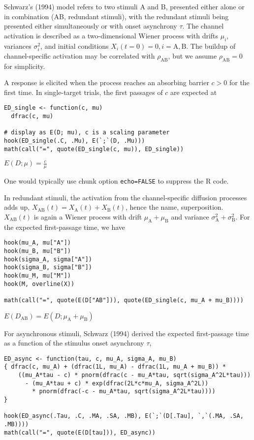 Schwarz's (1994) model refers to two stimuli A and B, presented either
alone or in combination (AB, redundant stimuli), with the redundant
stimuli being presented either simultaneously or with onset asynchrony
\(\tau\). The channel activation is described as a two-dimensional Wiener
process with drifts \(\mu_i\), variances \(\sigma^2_i\), and initial
conditions \(X_i(t = 0) = 0, i = \mathrm{A, B}\). The buildup of
channel-specific activation may be correlated with \(\rho_{\mathrm{AB}}\),
but we assume \(\rho_{\mathrm{AB}} = 0\) for simplicity.

A response is elicited when the process reaches an absorbing barrier
\(c > 0\) for the first time. In single-target trials, the first passages
of \(c\) are expected at

\begin{verbatim}
ED_single <- function(c, mu)
  dfrac(c, mu)

# display as E(D; mu), c is a scaling parameter
hook(ED_single(.C, .Mu), E(`;`(D, .Mu)))
math(call("=", quote(ED_single(c, mu)), ED_single))
\end{verbatim}

\({E{\left({D}{;}{\mu}\right)}}{=}{\displaystyle{\frac{c}{\mu}}}\)

One would typically use chunk option \texttt{echo=FALSE} to suppress the R
code.

In redundant stimuli, the activation from the channel-specific diffusion
processes adds up,
\(X_{\mathrm{AB}}(t) = X_{\mathrm A}(t) + X_{\mathrm B}(t)\), hence the
name, superposition. \(X_{\mathrm{AB}}(t)\) is again a Wiener process with
drift \(\mu_{\mathrm A} + \mu_{\mathrm B}\) and variance
\(\sigma^2_{\mathrm A} + \sigma^2_{\mathrm B}\). For the expected
first-passage time, we have

\begin{verbatim}
hook(mu_A, mu["A"])
hook(mu_B, mu["B"])
hook(sigma_A, sigma["A"])
hook(sigma_B, sigma["B"])
hook(mu_M, mu["M"])
hook(M, overline(X))

math(call("=", quote(E(D["AB"])), quote(ED_single(c, mu_A + mu_B))))
\end{verbatim}

\({E{\left({D}_{\mathrm{AB}}\right)}}{=}{E{\left({D}{;}{{{\mu}_{\mathrm{A}}}{+}{{\mu}_{\mathrm{B}}}}\right)}}\)

For asynchronous stimuli, Schwarz (1994) derived the expected
first-passage time as a function of the stimulus onset asynchrony
\(\tau\),

\begin{verbatim}
ED_async <- function(tau, c, mu_A, sigma_A, mu_B)
{ dfrac(c, mu_A) + (dfrac(1L, mu_A) - dfrac(1L, mu_A + mu_B)) *
    ((mu_A*tau - c) * pnorm(dfrac(c - mu_A*tau, sqrt(sigma_A^2L*tau)))
      - (mu_A*tau + c) * exp(dfrac(2L*c*mu_A, sigma_A^2L))
        * pnorm(dfrac(-c - mu_A*tau, sqrt(sigma_A^2L*tau))))
}

hook(ED_async(.Tau, .C, .MA, .SA, .MB), E(`;`(D[.Tau], `,`(.MA, .SA, .MB))))
math(call("=", quote(E(D[tau])), ED_async))
\end{verbatim}

